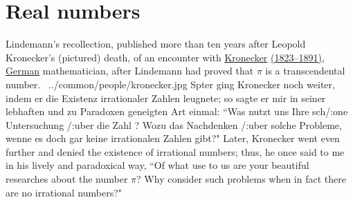 \section{Real numbers}

\qboxnpqt
  {Lindemann's recollection, published more than ten years after Leopold Kronecker's (pictured) death, of an encounter with 
    \href{http://en.wikipedia.org/wiki/Kronecker}{Kronecker}
    \href{http://www-history.mcs.st-andrews.ac.uk/Timelines/TimelineF.html}{(1823--1891)},
    \href{http://www-history.mcs.st-andrews.ac.uk/BirthplaceMaps/Places/Germany.html}{German} mathematician,
    after Lindemann had proved that $\pi$ is a transcendental number.~\footnotemark
  }
  {../common/people/kronecker.jpg}
  {Sp{\:}ter ging Kronecker noch weiter, indem er die Existenz irrationaler Zahlen leugnete;
   so sagte er mir in seiner lebhaften und zu Paradoxen geneigten Art einmal:
   ``Was n{\:u}tzt uns Ihre sch{/:o}ne Untersuchung {/:u}ber die Zahl \txpi?
   Wozu das Nachdenken {/:u}ber solche Probleme, 
   wenne es doch gar keine irrationalen Zahlen gibt?"}
  {Later, Kronecker went even further and denied the existence of irrational numbers; 
   thus, he once said to me in his lively and paradoxical way,
   ``Of what use to us are your beautiful researches about the number $\pi$?
     Why consider such problems when in fact there are no irrational numbers?" }

